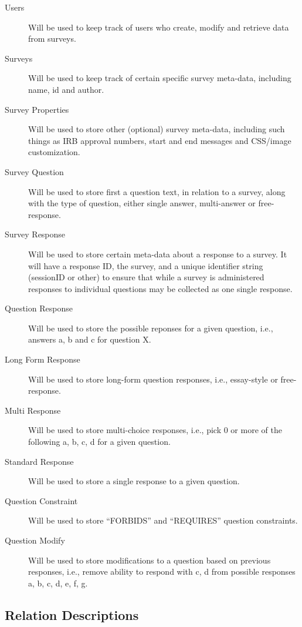 \documentclass{article}
\begin{document}
\begin{description}
\item[Users] Will be used to keep track of users who create, modify
  and retrieve data from surveys.
\item[Surveys] Will be used to keep track of certain specific survey
  meta-data, including name, id and author.
\item[Survey Properties] Will be used to store other (optional) survey
  meta-data, including such things as IRB approval numbers, start and
  end messages and CSS/image customization.
\item[Survey Question] Will be used to store first a question text, in
  relation to a survey, along with the type of question, either single
  answer, multi-answer or free-response.
\item[Survey Response] Will be used to store certain meta-data about a
  response to a survey.   It will have a response ID, the survey, and a
  unique identifier string (sessionID or other) to ensure that while a
  survey is administered responses to individual questions may be
  collected as one single response.
\item[Question Response] Will be used to store the possible reponses
  for a given question, i.e., answers a, b and c for question X.
\item[Long Form Response] Will be used to store long-form question
  responses, i.e., essay-style or free-response.
\item[Multi Response] Will be used to store multi-choice responses,
  i.e., pick 0 or more of the following a, b, c, d for a given
  question.
\item[Standard Response] Will be used to store a single response to a
  given question.
\item[Question Constraint] Will be used to store ``FORBIDS'' and
  ``REQUIRES'' question constraints.
\item[Question Modify] Will be used to store modifications to a
  question based on previous responses, i.e., remove ability to
  respond with c, d from possible responses a, b, c, d, e, f, g.
\end{description}

\subsection{Relation Descriptions}
\label{sec:relat-descr}
\end{document}
